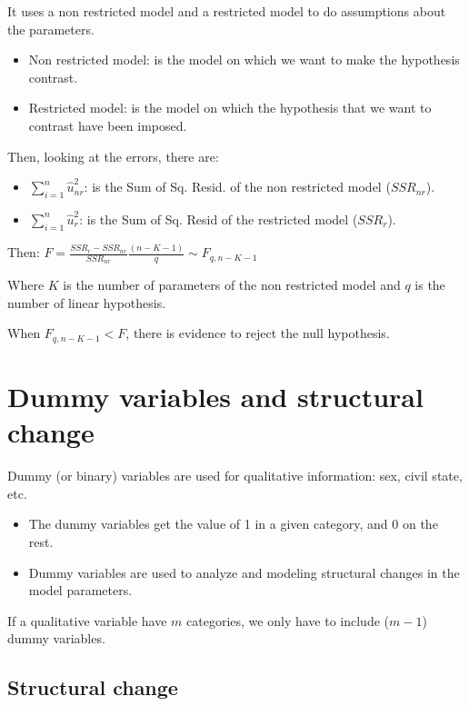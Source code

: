 \documentclass[10pt, a4paper, landscape]{extarticle}
\begin{document}
\begin{multicols}{3}
It uses a non restricted model and a restricted model to do assumptions about the parameters.

\begin{itemize}[leftmargin=*]
\item Non restricted model: is the model on which we want to make the hypothesis contrast.
\item Restricted model: is the model on which the hypothesis that we want to contrast have been imposed.
\end{itemize}

Then, looking at the errors, there are:

\begin{itemize}[leftmargin=*]
\item $\sum_{i=1}^n \hat{u}_{nr}^2$: is the Sum of Sq. Resid. of the non restricted model ($SSR_{nr}$).
\item $\sum_{i=1}^n \hat{u}_r^2$: is the Sum of Sq. Resid of the restricted model ($SSR_r$).
\end{itemize}

Then: $F = \frac{SSR_r - SSR_{nr}}{SSR_{nr}} \frac{(n-K-1)}{q} \sim F_{q, n-K-1}$

Where $K$ is the number of parameters of the non restricted model and $q$ is the number of linear hypothesis.

When $F_{q, n-K-1} < F$, there is evidence to reject the null hypothesis.

\section*{Dummy variables and structural change}

Dummy (or binary) variables are used for qualitative information: sex, civil state, etc.

\begin{itemize}[leftmargin=*]
\item The dummy variables get the value of 1 in a given category, and 0 on the rest.
\item Dummy variables are used to analyze and modeling structural changes in the model parameters.
\end{itemize}

If a qualitative variable have $m$ categories, we only have to include ($m-1$) dummy variables.

\subsection*{Structural change}


\end{multicols}
\end{document}
